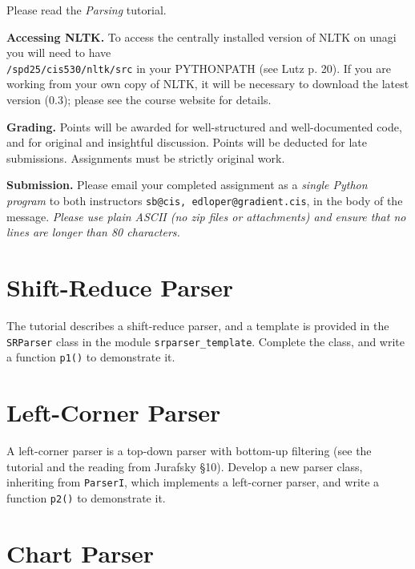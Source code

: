 \documentclass{cis530}
\begin{document}
\maketitle

Please read the \emph{Parsing} tutorial.

{\bf Accessing NLTK.}  
To access the centrally installed version of NLTK on unagi you will
need to have\\ \texttt{/spd25/cis530/nltk/src} in your PYTHONPATH (see
Lutz p. 20).  If you are working from your own copy of NLTK, it will
be necessary to download the latest version (0.3); please see the
course website for details.

{\bf Grading.}  
Points will be awarded for well-structured and well-documented code,
and for original and insightful discussion.
Points will be deducted for late submissions.  Assignments must be
strictly original work.

{\bf Submission.}  
Please email your completed assignment as a
\emph{single Python program} to both instructors
\texttt{sb@cis, edloper@gradient.cis}, in the body of the message.
\emph{Please use plain ASCII (no zip files or attachments) and ensure
that no lines are longer than 80 characters.}
\vspace{2ex}

\section{Shift-Reduce Parser}

The tutorial describes a shift-reduce parser, and a template is
provided in the \texttt{SRParser} class in the module \verb|srparser_template|.
Complete the class, and write a function \texttt{p1()} to demonstrate it.

\section{Left-Corner Parser}

A left-corner parser is a top-down parser with bottom-up filtering
(see the tutorial and the reading from Jurafsky \S 10).
Develop a new parser class, inheriting from \texttt{ParserI}, which
implements a left-corner parser, and write a function \texttt{p2()} to
demonstrate it.

\section{Chart Parser}
\end{document}
